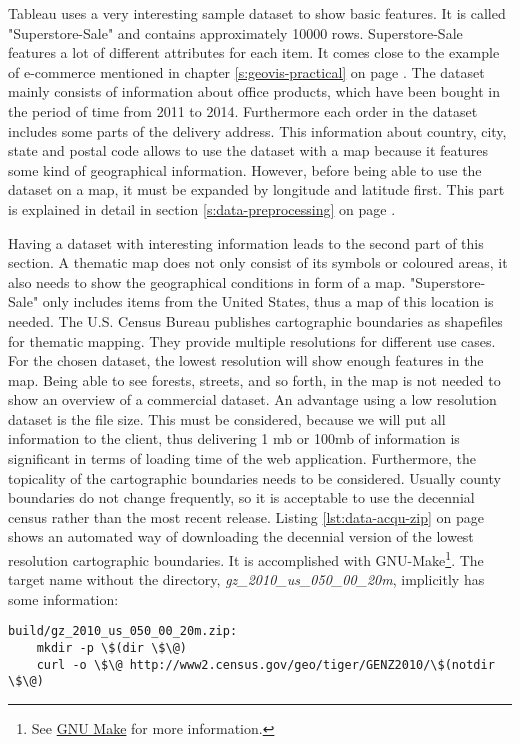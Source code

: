 Tableau uses a very interesting sample dataset to show basic features. It is called "Superstore-Sale" and contains approximately 10000 rows. Superstore-Sale features a lot of different attributes for each item. It comes close to the example of e-commerce mentioned in chapter \ref{s:geovis-practical} on page \pageref{s:geovis-practical}. The dataset mainly consists of information about office products, which have been bought in the period of time from 2011 to 2014. Furthermore each order in the dataset includes some parts of the delivery address. This information about country, city, state and postal code allows to use the dataset with a map because it features some kind of geographical information. However, before being able to use the dataset on a map, it must be expanded by longitude and latitude first. This part is explained in detail in section \ref{s:data-preprocessing} on page \pageref{s:data-preprocessing}.

Having a dataset with interesting information leads to the second part of this section. A thematic map does not only consist of its symbols or coloured areas, it also needs to show the geographical conditions in form of a map. "Superstore-Sale" only includes items from the United States, thus a map of this location is needed. The U.S. Census Bureau publishes cartographic boundaries as shapefiles for thematic mapping. They provide multiple resolutions for different use cases. For the chosen dataset, the lowest resolution will show enough features in the map. Being able to see forests, streets, and so forth, in the map is not needed to show an overview of a commercial dataset. An advantage using a low resolution dataset is the file size. This must be considered, because we will put all information to the client, thus delivering 1 \ac{mb} or 100\ac{mb} of information is significant in terms of loading time of the web application.
Furthermore, the topicality of the cartographic boundaries needs to be considered. Usually county boundaries do not change frequently, so it is acceptable to use the decennial census rather than the most recent release. Listing \ref{lst:data-acqu-zip} on page \pageref{lst:data-acqu-zip} shows an automated way of downloading the decennial version of the lowest resolution cartographic boundaries. It is accomplished with GNU-Make\footnote{See \href{https://www.gnu.org/software/make/}{GNU Make} for more information.}. The target name without the directory, \textit{gz_2010_us_050_00_20m}, implicitly has some information:

\begin{lstlisting}[style={make-pretty}, caption={Make task for downloading cartographic boundaries}, label={lst:data-acqu-zip}]
build/gz_2010_us_050_00_20m.zip:
    mkdir -p \$(dir \$\@)
    curl -o \$\@ http://www2.census.gov/geo/tiger/GENZ2010/\$(notdir \$\@)
\end{lstlisting}

